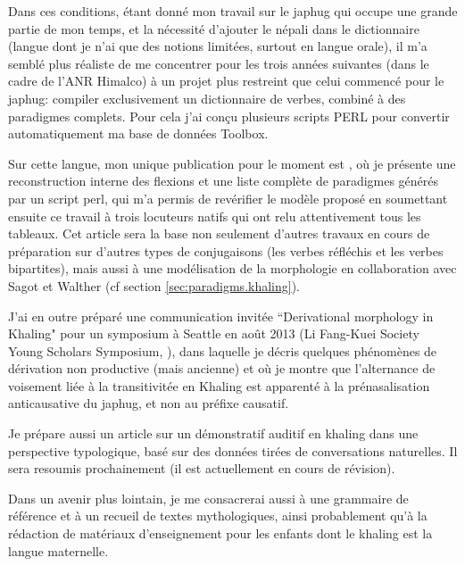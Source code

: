 \documentclass[oldfontcommands,oneside,a4paper,11pt]{memoir}
\begin{document}
Dans ces conditions, étant donné mon travail sur le japhug qui occupe une grande partie de mon temps, et la nécessité d'ajouter le népali dans le dictionnaire (langue dont je n'ai que des notions limitées, surtout en langue orale), il m'a semblé plus réaliste de me concentrer pour les trois années suivantes (dans le cadre de l'ANR Himalco) à un projet plus restreint que celui commencé pour le japhug: compiler exclusivement un dictionnaire de verbes, combiné à des paradigmes complets. Pour cela j'ai conçu plusieurs scripts PERL pour convertir automatiquement ma base de données Toolbox.

Sur cette langue, mon unique publication pour le moment est \citet{jacques12khaling}, où je présente une reconstruction interne des flexions et une liste complète de paradigmes générés par un script perl, qui m'a permis de revérifier le modèle proposé en soumettant ensuite ce travail à trois locuteurs natifs qui ont relu attentivement tous les tableaux. Cet article sera la base non seulement d'autres travaux en cours de préparation sur d'autres types de conjugaisons (les verbes réfléchis et les verbes bipartites), mais aussi à une modélisation de la morphologie en collaboration avec Sagot et Walther (cf section \ref{sec:paradigms.khaling}).

J'ai en outre préparé une communication invitée ``Derivational morphology in Khaling"   pour un symposium à Seattle en août 2013 (Li Fang-Kuei Society Young Scholars Symposium, \citealt{jacques13derivational.khaling}), dans laquelle je décris quelques phénomènes de dérivation non productive (mais ancienne) et où je montre que l'alternance de voisement liée à la transitivitée en Khaling est apparenté à la prénasalisation anticausative du japhug, et non au préfixe causatif.

Je prépare aussi un article sur un démonstratif auditif en khaling dans une perspective typologique, basé sur des données tirées de conversations naturelles. Il sera resoumis prochainement (il est actuellement en cours de révision).


Dans un avenir plus lointain, je me consacrerai aussi à une grammaire de référence et à un recueil de textes mythologiques, ainsi probablement qu'à la rédaction de matériaux d'enseignement pour les enfants dont le khaling est la langue maternelle.
\end{document}
